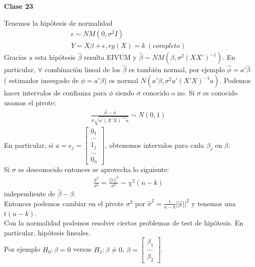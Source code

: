 \documentclass[10pt]{article}
\theoremstyle{plain}
\theoremstyle{definition}
\newcommand{\catnum}{23} %
\begin{document}
\begin{center}
\LARGE\textbf{Clase \catnum}
\end{center}
Tenemos la hipótesis de normalidad
\begin{align*}
\epsilon \sim NM(0,\sigma^2I)\\
Y = X\beta + \epsilon, rg(X) = k\ (completo)
\end{align*}
Gracias a esta hipótesis $\hat{\beta}$ resulta EIVUM y $\hat{\beta} \sim NM(\beta , \sigma^2(XX')^{-1})$. En particular, $\forall$ combinación lineal de los $\hat{\beta}$ es también normal, por ejemplo $\hat{\phi} = a'\hat{\beta}$ ( estimador insesgado de $\phi = a'\beta$) es normal $N(a'\beta , \sigma^2 a'(X'X)^{-1}a)$. Podemos hacer intervalos de confianza para $\phi$ siendo $\sigma$ conocido o no. Si $\sigma$ es conocido usamos el pivote:
\begin{align*}
\frac{\hat{\phi}-\phi}{\sigma\sqrt{a'(X'X)^{-1}a}} \sim N(0,1)
\end{align*}
En particular, si $a = e_{j} = \begin{bmatrix}
0_{1}\\ \ldots \\
1_{j} \\ \ldots \\ 0_{n}\end{bmatrix}$, obtenemos intervalos para cada $\beta_{j}$ en $\beta$.\\
Si $\sigma$ es desconocido entonces se aprovecha lo siguiente:
\begin{align*}
\frac{\hat{\sigma}^2}{\sigma^2} = \frac{||\hat{\epsilon}||^2}{\sigma^2} \sim \chi^2 (n-k)
\end{align*}
independiente de $\hat{\beta}-\beta$.\\

Entonces podemos cambiar en el pivote $\sigma^2$ por $\hat{\sigma}^2 = \frac{1}{n-k}||\hat{\epsilon}||^2$ y tenemos una $t(n-k)$.\\

Con la normalidad podemos resolver ciertos problemas de test de hipótesis. En particular, hipótesis lineales.\\

Por ejemplo $H_{0}\colon \beta = 0$ versus $H_{1}\colon \beta \not = 0$, $\beta = \begin{bmatrix}
\beta_{1}\\ \ldots \\ \beta_{2}
\end{bmatrix}$.\\
\end{document}
